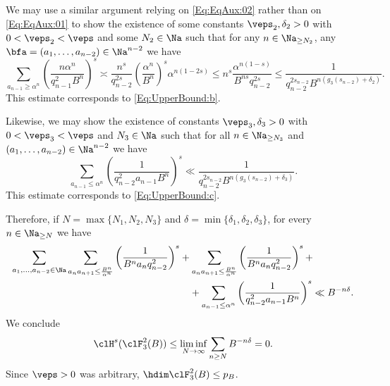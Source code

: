 \documentclass[12pt,a4paper]{amsart}
\begin{document}
We may use a similar argument relying on \eqref{Eq:EqAux:02} rather than on \eqref{Eq:EqAux:01} to show the existence of some constants $\veps_2,\delta_2>0$ with $0<\veps_2<\veps$ and some $N_2\in\Na$ such that for any $n\in\Na_{\geq N_2}$, any $\bfa=(a_1,\ldots, a_{n-2})\in\Na^{n-2}$ we have%
\[
\sum_{a_{n-1}\geq \alpha^n} 
\left(\frac{n\alpha^n}{q_{n-1}^2B^n}\right)^s
\asymp
\frac{n^s}{q_{n-2}^{2s}} \left(\frac{\alpha^n}{B^n}\right)^s\alpha^{n(1-2s)}
\leq
n^s 
\frac{\alpha^{n(1-s)}}{B^{ns}q_{n-2}^{2s}} 
\leq
\frac{1}{q_{n-2}^{2s_{n-2}}B^{n(g_3(s_{n-2}) + \delta_2)}}.
\]
This estimate corresponds to \eqref{Eq:UpperBound:b}.

Likewise, we may show the existence of constants $\veps_3,\delta_3>0$ with $0<\veps_3<\veps$ and $N_3\in\Na$ such that for all $n\in\Na_{\geq N_3}$ and $(a_1,\ldots, a_{n-2})\in\Na^{n-2}$ we have
\[
\sum_{a_{n-1}\leq \alpha^n}
\left(\frac{1}{q_{n-2}^2a_{n-1}B^n}\right)^s
\ll
\frac{1}{q_{n-2}^{2s_{n-2}} B^{n(g_3(s_{n-2}) + \delta_3)}}.
\]
This estimate corresponds to \eqref{Eq:UpperBound:c}.

Therefore, if $N=\max\{N_1,N_2,N_3\}$ and $\delta=\min\{\delta_1, \delta_2, \delta_3\}$, for every $n\in\Na_{\geq N}$ we have
\begin{align*}
\sum_{a_1,\ldots, a_{n-2}\in\Na} 
\sum_{a_n a_{n+1}\leq \frac{B^n}{\alpha^n}}
\left( \frac{1}{B^na_nq_{n-2}^2} \right)^s 
&+ 
\sum_{a_n a_{n+1}\leq \frac{B^n}{\alpha^n}}
 \left( \frac{1}{B^na_nq_{n-2}^2} \right)^s + \\
&\quad+
\sum_{a_{n-1}\leq \alpha^n}
\left(\frac{1}{q_{n-2}^2a_{n-1}B^n}\right)^s 
\ll
B^{-n\delta}.
\end{align*}
We conclude
\[
\clH^{s}(\clF_3^{2}(B))
\leq 
\liminf_{N\to\infty} \sum_{n\geq N} B^{-n\delta} = 0.
\]
Since $\veps>0$ was arbitrary, $\hdim \clF_3^{2}(B)\leq p_B$.
\end{document}
